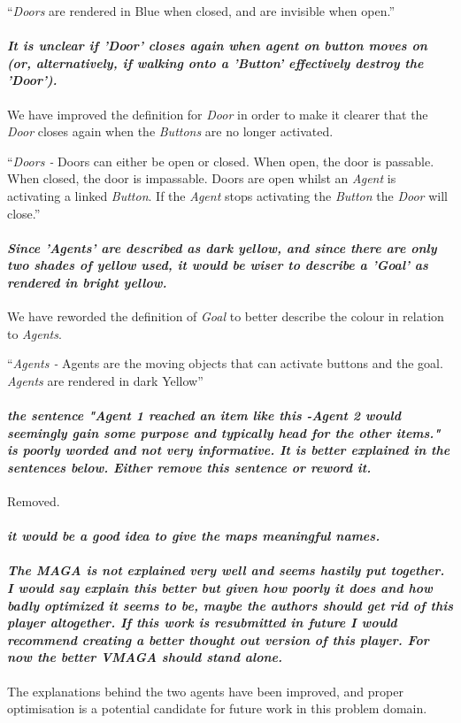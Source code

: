 \documentclass{article}
\begin{document}
``\emph{Doors} are rendered in Blue when closed, and are invisible when open.''
\paragraph*{\textit{It is unclear if 'Door' closes again when agent on button moves on (or, alternatively, if walking onto a 'Button' effectively destroy the 'Door').}}
We have improved the definition for \emph{Door} in order to make it clearer that the \emph{Door} closes again when the \emph{Buttons} are no longer activated.

``\emph{Doors -} Doors can either be open or closed. When open, the door is passable. When closed, the door is impassable. Doors are open whilst an \emph{Agent} is activating a linked \emph{Button}. If the \emph{Agent} stops activating the \emph{Button} the \emph{Door} will close.''
\paragraph*{\textit{Since 'Agents' are described as dark yellow, and since there are only two shades of yellow used, it would be wiser to describe a 'Goal' as rendered in bright yellow.}}
We have reworded the definition of \emph{Goal} to better describe the colour in relation to \emph{Agents}.

``\emph{Agents -} Agents are the moving objects that can activate buttons and the goal. \emph{Agents} are rendered in dark Yellow''
\paragraph*{\textit{the sentence "Agent 1 reached an item like this -Agent 2 would seemingly gain some purpose and typically head for the other items." is poorly worded and not very informative. It is better explained in the sentences below. Either remove this sentence or reword it.}}
Removed.

\paragraph*{\textit{it would be a good idea to give the maps meaningful names.}}
\paragraph*{\textit{The MAGA is not explained very well and seems hastily put together. I would say explain this better but given how poorly it does and how badly optimized it seems to be, maybe the authors should get rid of this player altogether. If this work is resubmitted in future I would recommend creating a better thought out version of this player. For now the better VMAGA should stand alone.
}}
The explanations behind the two agents have been improved, and proper optimisation is a potential candidate for future work in this problem domain.
\end{document}
